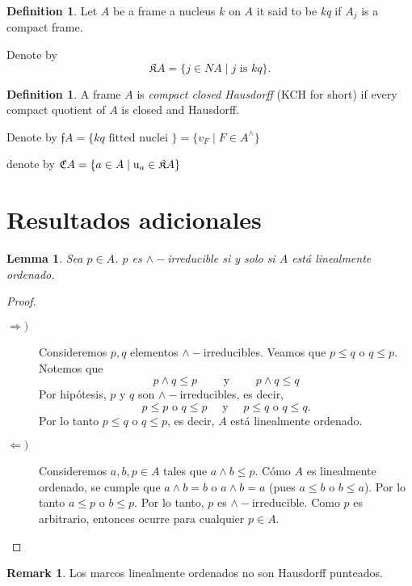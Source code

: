 \documentclass[11pt]{amsart}
\theoremstyle{plain}
\newtheorem{lem}[thm]{Lemma}
\theoremstyle{definition}
\newtheorem{dfn}[thm]{Definition}
\newtheorem{obs}[thm]{Remark}
\begin{document}
\begin{dfn}\label{KQ}
Let $A$ be a frame a nucleus $k$ on $A$ it said to be \emph{kq} if $A_{j}$ is a compact frame. 
\end{dfn}
Denote by 
\[
\mathfrak{K}A=\{j\in NA\mid j \text{ is } kq\}.
\]

\begin{dfn}\label{KCH}
A frame $A$ is \emph{compact closed Hausdorff} ({\rm KCH} for short) if every compact quotient of $A$ is closed and Hausdorff.
\end{dfn}



Denote by $\mathfrak{f}A=\{kq\text{ fitted nuclei }\}=\{v_{F}\mid F\in A^{\wedge}\}$




denote by $\mathfrak{C}A=\{a\in A\mid {\rm u}_{a}\in\mathfrak{K}A\}$

\section{Resultados adicionales}

\begin{lem}
    Sea $p\in A$. $p$ es $\wedge-$irreducible si y solo si $A$ está linealmente ordenado.
\end{lem}

\begin{proof}
\begin{description}
    \item[$\Rightarrow )$] Consideremos $p, q$ elementos $\wedge-$irreducibles. Veamos que $p\leq q$ o $q\leq p$. Notemos que 
    \[
    p\wedge q\leq p\qquad \mbox{ y }\qquad p\wedge q\leq q 
    \]
    Por hipótesis, $p$ y $q$ son $\wedge-$irreducibles, es decir, 
    \[
    p\leq p \mbox{ o }q\leq p\quad\mbox{ y }\quad p\leq q \mbox{ o }q\leq q.
    \]
    Por lo tanto $p\leq q$ o $q\leq p$, es decir, $A$ está linealmente ordenado.

    \item[$\Leftarrow )$] Consideremos $a,b, p\in A$ tales que $a\wedge b\leq p$. Cómo $A$ es linealmente ordenado, se cumple que $a\wedge b=b$ o $a\wedge b=a$ (pues $a\leq b$ o $b\leq a$). Por lo tanto $a\leq p$ o $b\leq p$. Por lo tanto, $p$ es $\wedge-$irreducible. Como $p$ es arbitrario, entonces ocurre para cualquier $p\in A$.
\end{description}
\end{proof}

\begin{obs}
    Los marcos linealmente ordenados no son Hausdorff punteados. 
\end{obs}
\end{document}
